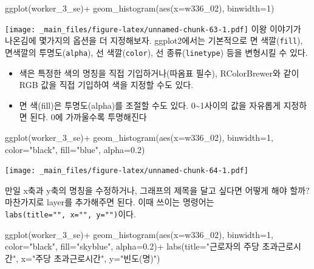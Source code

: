 \documentclass[
]{book}
\newenvironment{Shaded}{\begin{snugshade}}{\end{snugshade}}
\newcommand{\AttributeTok}[1]{\textcolor[rgb]{0.77,0.63,0.00}{#1}}
\newcommand{\DecValTok}[1]{\textcolor[rgb]{0.00,0.00,0.81}{#1}}
\newcommand{\FloatTok}[1]{\textcolor[rgb]{0.00,0.00,0.81}{#1}}
\newcommand{\FunctionTok}[1]{\textcolor[rgb]{0.00,0.00,0.00}{#1}}
\newcommand{\NormalTok}[1]{#1}
\newcommand{\SpecialCharTok}[1]{\textcolor[rgb]{0.00,0.00,0.00}{#1}}
\newcommand{\StringTok}[1]{\textcolor[rgb]{0.31,0.60,0.02}{#1}}
\providecommand{\tightlist}{%
  \setlength{\itemsep}{0pt}\setlength{\parskip}{0pt}}
\theoremstyle{definition}
\theoremstyle{definition}
\theoremstyle{definition}
\theoremstyle{definition}
\theoremstyle{remark}
\begin{document}
\begin{Shaded}
\begin{Highlighting}[]
\FunctionTok{ggplot}\NormalTok{(worker\_3\_se)}\SpecialCharTok{+}
  \FunctionTok{geom\_histogram}\NormalTok{(}\FunctionTok{aes}\NormalTok{(}\AttributeTok{x=}\NormalTok{w336\_02), }\AttributeTok{binwidth=}\DecValTok{1}\NormalTok{)}
\end{Highlighting}
\end{Shaded}

\texttt{[image: \_main\_files/figure-latex/unnamed-chunk-63-1.pdf]}
이왕 이야기가 나온김에 몇가지의 옵션을 더 지정해보자. ggplot2에서는 기본적으로 면 색깔(\texttt{fill}), 면색깔의 투명도(\texttt{alpha}), 선 색깔(\texttt{color}), 선 종류(\texttt{linetype}) 등을 변형시킬 수 있다.

\begin{itemize}
\tightlist
\item
  색은 특정한 색의 명칭을 직접 기입하거나(따옴표 필수), RColorBrewer와 같이 RGB 값을 직접 기입하여 색을 지정할 수도 있다.
\item
  면 색(fill)은 투명도(alpha)를 조절할 수도 있다. 0\textasciitilde1사이의 값을 자유롭게 지정하면 된다. 0에 가까울수록 투명해진다
\end{itemize}

\begin{Shaded}
\begin{Highlighting}[]
\FunctionTok{ggplot}\NormalTok{(worker\_3\_se)}\SpecialCharTok{+}
  \FunctionTok{geom\_histogram}\NormalTok{(}\FunctionTok{aes}\NormalTok{(}\AttributeTok{x=}\NormalTok{w336\_02), }\AttributeTok{binwidth=}\DecValTok{1}\NormalTok{, }\AttributeTok{color=}\StringTok{"black"}\NormalTok{, }\AttributeTok{fill=}\StringTok{"blue"}\NormalTok{, }\AttributeTok{alpha=}\FloatTok{0.2}\NormalTok{)}
\end{Highlighting}
\end{Shaded}

\texttt{[image: \_main\_files/figure-latex/unnamed-chunk-64-1.pdf]}

만일 x축과 y축의 명칭을 수정하거나, 그래프의 제목을 달고 싶다면 어떻게 해야 할까? 마찬가지로 layer를 추가해주면 된다. 이때 쓰이는 명령어는 \texttt{labs(title="",\ x="",\ y="")}이다.

\begin{Shaded}
\begin{Highlighting}[]
\FunctionTok{ggplot}\NormalTok{(worker\_3\_se)}\SpecialCharTok{+}
  \FunctionTok{geom\_histogram}\NormalTok{(}\FunctionTok{aes}\NormalTok{(}\AttributeTok{x=}\NormalTok{w336\_02), }\AttributeTok{binwidth=}\DecValTok{1}\NormalTok{, }\AttributeTok{color=}\StringTok{"black"}\NormalTok{, }\AttributeTok{fill=}\StringTok{"skyblue"}\NormalTok{, }\AttributeTok{alpha=}\FloatTok{0.2}\NormalTok{)}\SpecialCharTok{+}
  \FunctionTok{labs}\NormalTok{(}\AttributeTok{title=}\StringTok{"근로자의 주당 초과근로시간"}\NormalTok{, }\AttributeTok{x=}\StringTok{"주당 초과근로시간"}\NormalTok{, }\AttributeTok{y=}\StringTok{"빈도(명)"}\NormalTok{)}
\end{Highlighting}
\end{Shaded}
\end{document}
